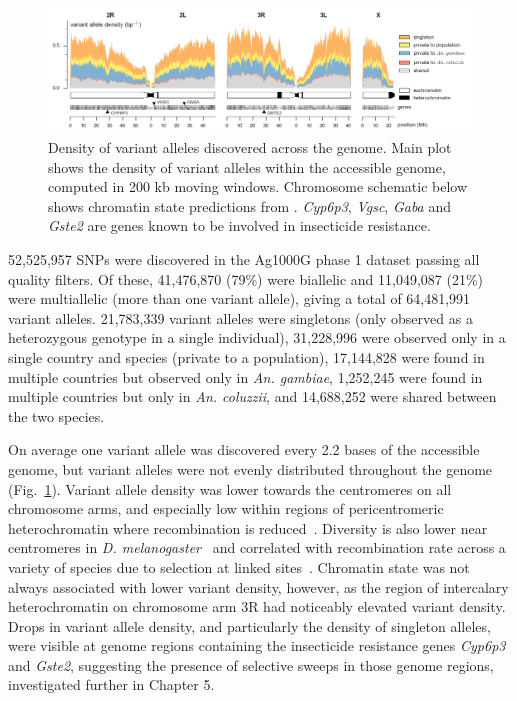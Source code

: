 \begin{refsection}
\begin{figure}[t!]
\centering
\includegraphics[width=1.1\textwidth,center]{artwork/chapter3/variant_density.png}
\caption{Density of variant alleles discovered across the genome.
%
Main plot shows the density of variant alleles within the accessible genome, computed in 200 kb moving windows.
%
Chromosome schematic below shows chromatin state predictions from \textcite{Sharakhova2010}.
%
\textit{Cyp6p3}, \textit{Vgsc}, \textit{Gaba} and \textit{Gste2} are genes known to be involved in insecticide resistance.
}
%
\label{fig:ch3-variant_density}
\end{figure}


52,525,957 SNPs were discovered in the Ag1000G phase 1 dataset passing all quality filters.
%
Of these, 41,476,870 (79\%) were biallelic and 11,049,087 (21\%) were multiallelic (more than one variant allele), giving a total of 64,481,991 variant alleles.
%
21,783,339 variant alleles were singletons (only observed as a heterozygous genotype in a single individual), 31,228,996 were observed only in a single country and species (private to a population), 17,144,828 were found in multiple countries but observed only in \textit{An. gambiae}, 1,252,245 were found in multiple countries but only in \textit{An. coluzzii}, and 14,688,252 were shared between the two species.


On average one variant allele was discovered every 2.2 bases of the accessible genome,
but variant alleles were not evenly distributed throughout the genome (Fig.~\ref{fig:ch3-variant_density}).
%
Variant allele density was lower towards the centromeres on all chromosome arms, and especially low within regions of pericentromeric heterochromatin where recombination is reduced~\parencite{Pombi2006,Zheng1997}.
%
Diversity is also lower near centromeres in \textit{D. melanogaster}~\parencite{Langley2012} and correlated with recombination rate across a variety of species due to selection at linked sites~\parencite{Charlesworth2012a,Elyashiv2016,
CorbettDetig2015,Burri2015,Chan2012,Spencer2006}.
%
Chromatin state was not always associated with lower variant density, however, as the region of intercalary heterochromatin on chromosome arm 3R had noticeably elevated variant density.
%
Drops in variant allele density, and particularly the density of singleton alleles, were visible at genome regions containing the insecticide resistance genes \textit{Cyp6p3} and \textit{Gste2}, suggesting the presence of selective sweeps in those genome regions, investigated further in Chapter 5.



\end{refsection}
